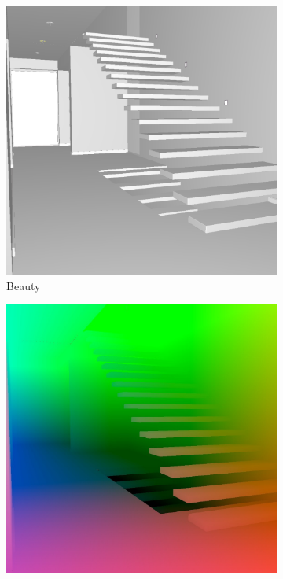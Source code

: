 \begin{figure}
	\centering
	\begin{subfigure}[t]{0.24\linewidth}
		\includegraphics[width=\textwidth]{chapters/chapter_thetool/beauty_scenepass1}
		\caption{Beauty}
		\label{beauty_scenepass1}
	\end{subfigure}
	\begin{subfigure}[t]{0.24\linewidth}
		\includegraphics[width=\textwidth]{chapters/chapter_thetool/worldpos_scenepass1}

\end{subfigure}
\end{figure}
